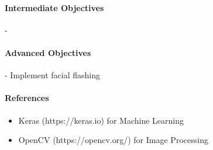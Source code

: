 \documentclass{article}
\begin{document}
    \paragraph{Intermediate Objectives}
        \begin{itemize}
          - 
        \end{itemize}
    \paragraph{Advanced Objectives}
        \begin{itemize}
         - Implement facial flashing
        \end{itemize}
    \paragraph{References}
        \begin{itemize}
            \item Keras (https://keras.io) for Machine Learning
            \item OpenCV (https://opencv.org/) for Image Processing
        \end{itemize}

   
\end{document}
